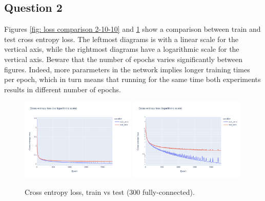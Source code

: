 \documentclass[12pt]{article}
\begin{document}
\subsection{Question 2}
Figures \ref{fig: loss comparison 2-10-10} and \ref{fig: loss comparison 1-300} show a comparison between train and test cross entropy loss.
The leftmost diagrams is with a linear scale for the vertical axis, while the rightmost diagrams have a logarithmic scale for the vertical axis.
Beware that the number of epochs varies significantly between figures.
Indeed, more pararmeters in the network implies longer training times per epoch, which in turn means that running for the same time both experiments results in different number of epochs. \\
\begin{figure}[ht]
    \centering
    \includegraphics[width=0.49\textwidth]{images/cross-entropy-comparison-1-300.png}
    \includegraphics[width=0.49\textwidth]{images/cross-entropy-comparison-1-300-log.png}
    \caption{Cross entropy loss, train vs test ($300$ fully-connected).}
    \label{fig: loss comparison 1-300}
\end{figure}
\end{document}
